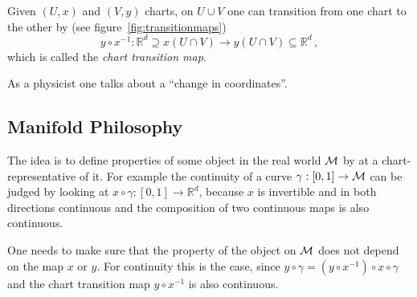 \documentclass[11pt, a4paper, twocolumn]{article} %
\begin{document}
\begin{figure*}[tbh]

    \caption{Visualization of chart transition maps. ``How to glue together the charts of an atlas.'' Plot modified from~\citep{texstackexchange:manifolds}}
    \label{fig:transitionmaps}
\end{figure*}
Given $(U, x)$ and $(V, y)$ charts, on $U\cup V$ one can transition from
one chart to the other by (see figure~\ref{fig:transitionmaps})
\begin{equation}
    y\circ x^{-1}: \mathbb{R}^{d} \supseteq x(U\cap V) \to y(U\cap V) \subseteq \mathbb{R}^{d}\,,
\end{equation}
which is called the \textit{chart transition map}.
\begin{note}
    As a physicist one talks about a ``change in coordinates''.
\end{note}

\subsection{Manifold Philosophy}

The idea is to define properties of some object in the real world $\mathcal{M}$ by at a chart-representative
of it. For example the continuity of a curve $\gamma: [0,1]\to\mathcal{M}$ can be judged by looking at
$x\circ\gamma: [0,1]\to\mathbb{R}^{d}$, because $x$ is invertible and in both directions continuous
and the composition of two continuous maps is also continuous.
\begin{note}
    One needs to make sure that the property of the object on $\mathcal{M}$ does not depend on the
    map $x$ or $y$. For continuity this is the case, since 
    $y\circ\gamma = (y\circ x^{-1}) \circ x\circ \gamma$ and the chart transition map
    $y\circ x^{-1}$ is also continuous.
\end{note}
\end{document}
